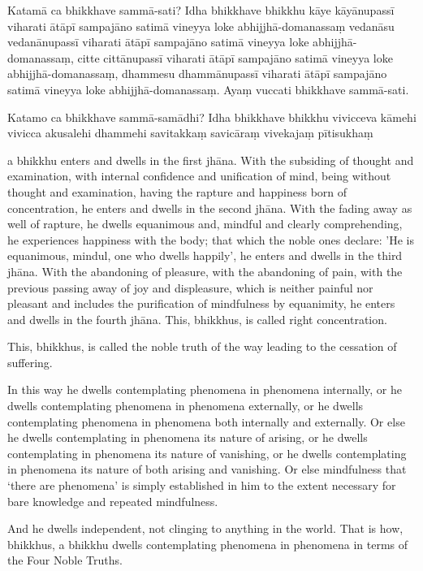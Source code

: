Katamā ca bhikkhave sammā-sati? Idha bhikkhave bhikkhu kāye kāyānupassī viharati
ātāpī sampajāno satimā vineyya loke abhijjhā-domanassaṃ vedanāsu vedanānupassī
viharati ātāpī sampajāno satimā vineyya loke abhijjhā-domanassaṃ, citte
cittānupassī viharati ātāpī sampajāno satimā vineyya loke abhijjhā-domanassaṃ,
dhammesu dhammānupassī viharati ātāpī sampajāno satimā vineyya loke
abhijjhā-domanassaṃ. Ayaṃ vuccati bhikkhave sammā-sati.

Katamo ca bhikkhave sammā-samādhi? Idha bhikkhave bhikkhu vivicceva kāmehi
vivicca akusalehi dhammehi savitakkaṃ savicāraṃ vivekajaṃ pītisukhaṃ

\englishPage

a bhikkhu enters and dwells in the first jhāna. With the subsiding of thought
and examination, with internal confidence and unification of mind, being without
thought and examination, having the rapture and happiness born of concentration,
he enters and dwells in the second jhāna. With the fading away as well of
rapture, he dwells equanimous and, mindful and clearly comprehending, he
experiences happiness with the body; that which the noble ones declare: 'He is
equanimous, mindul, one who dwells happily', he enters and dwells in the third
jhāna. With the abandoning of pleasure, with the abandoning of pain, with the
previous passing away of joy and displeasure, which is neither painful nor
pleasant and includes the purification of mindfulness by equanimity, he enters
and dwells in the fourth jhāna. This, bhikkhus, is called right concentration.

This, bhikkhus, is called the noble truth of the way leading to the cessation of
suffering.

In this way he dwells contemplating phenomena in phenomena internally, or he
dwells contemplating phenomena in phenomena externally, or he dwells
contemplating phenomena in phenomena both internally and externally. Or else he
dwells contemplating in phenomena its nature of arising, or he dwells
contemplating in phenomena its nature of vanishing, or he dwells contemplating
in phenomena its nature of both arising and vanishing. Or else mindfulness that
‘there are phenomena’ is simply established in him to the extent necessary for
bare knowledge and repeated mindfulness.

And he dwells independent, not clinging to anything in the world. That is how,
bhikkhus, a bhikkhu dwells contemplating phenomena in phenomena in terms of the
Four Noble Truths.


